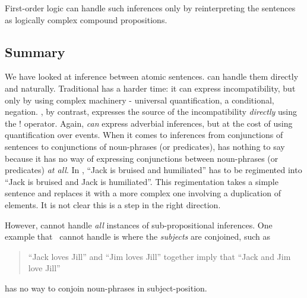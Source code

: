 \NI First-order logic can handle such inferences only by
reinterpreting the sentences as logically complex compound
propositions.

\subsection{Summary}

We have looked at inference between atomic sentences. \Cathoristic{}
can handle them directly and naturally.  Traditional \fol{} has a
harder time: it can express incompatibility, but only by using
complex machinery - universal quantification, a conditional,
negation. \Cathoristic{}, by contrast, expresses the source of the
incompatibility \emph{directly} using the $!$ operator.  Again, \fol{}
\emph{can} express adverbial inferences, but at the cost of using
quantification over events.  When it comes to inferences from
conjunctions of sentences to conjunctions of noun-phrases (or
predicates), \fol{} has nothing to say because it has no way of
expressing conjunctions between noun-phrases (or predicates) \emph{at
  all}. In \fol{}, ``Jack is bruised and humiliated'' has to be
regimented into ``Jack is bruised and Jack is humiliated''.  
This regimentation takes a simple sentence and replaces it with a more complex one involving a duplication of elements. 
It is not clear this is a step in the right direction.

However, \cathoristic{} cannot handle \emph{all} instances of
sub-propositional inferences.  
One example that \cathoristic\ cannot handle is where the
\emph{subjects} are conjoined, such as
\begin{quote}
``Jack loves Jill'' and ``Jim loves Jill'' together imply that ``Jack and Jim love Jill''
\end{quote}

\NI \Cathoristic{} has no way to conjoin noun-phrases in subject-position.
